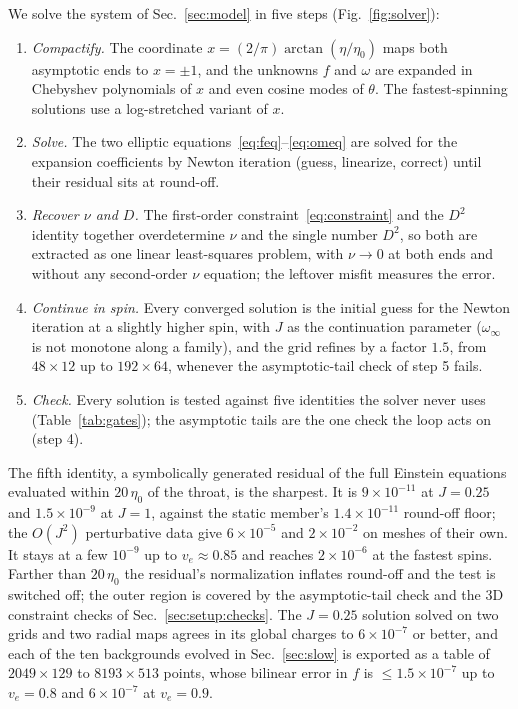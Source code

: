 \documentclass[twocolumn,floatfix,aps,prd,superscriptaddress,nofootinbib]{revtex4-2}
\begin{document}
We solve the system of Sec.~\ref{sec:model} in five steps (Fig.~\ref{fig:solver}):
\begin{enumerate}
\item\emph{Compactify.} The coordinate $x=(2/\pi)\arctan(\eta/\eta_0)$ maps both asymptotic ends to $x=\pm1$, and the unknowns $f$ and $\omega$ are expanded in Chebyshev polynomials of $x$ and even cosine modes of $\theta$. The fastest-spinning solutions use a log-stretched variant of $x$.
\item\emph{Solve.} The two elliptic equations~\eqref{eq:feq}--\eqref{eq:omeq} are solved for the expansion coefficients by Newton iteration (guess, linearize, correct) until their residual sits at round-off.
\item\emph{Recover $\nu$ and $D$.} The first-order constraint~\eqref{eq:constraint} and the $D^2$ identity together overdetermine $\nu$ and the single number $D^2$, so both are extracted as one linear least-squares problem, with $\nu\to0$ at both ends and without any second-order $\nu$ equation; the leftover misfit measures the error.
\item\emph{Continue in spin.} Every converged solution is the initial guess for the Newton iteration at a slightly higher spin, with $J$ as the continuation parameter ($\omega_\infty$ is not monotone along a family), and the grid refines by a factor $1.5$, from $48\times12$ up to $192\times64$, whenever the asymptotic-tail check of step 5 fails.
\item\emph{Check.} Every solution is tested against five identities the solver never uses (Table~\ref{tab:gates}); the asymptotic tails are the one check the loop acts on (step 4).
\end{enumerate}
The fifth identity, a symbolically generated residual of the full Einstein equations evaluated within $20\,\eta_0$ of the throat, is the sharpest. It is $9\times10^{-11}$ at $J=0.25$ and $1.5\times10^{-9}$ at $J=1$, against the static member's $1.4\times10^{-11}$ round-off floor; the $O(J^2)$ perturbative data give $6\times10^{-5}$ and $2\times10^{-2}$ on meshes of their own. It stays at a few $10^{-9}$ up to $v_e\approx0.85$ and reaches $2\times10^{-6}$ at the fastest spins. Farther than $20\,\eta_0$ the residual's normalization inflates round-off and the test is switched off; the outer region is covered by the asymptotic-tail check and the 3D constraint checks of Sec.~\ref{sec:setup:checks}. The $J=0.25$ solution solved on two grids and two radial maps agrees in its global charges to $6\times10^{-7}$ or better, and each of the ten backgrounds evolved in Sec.~\ref{sec:slow} is exported as a table of $2049\times129$ to $8193\times513$ points, whose bilinear error in $f$ is $\le1.5\times10^{-7}$ up to $v_e=0.8$ and $6\times10^{-7}$ at $v_e=0.9$.
\end{document}
